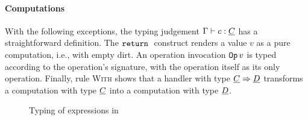 \paragraph{Computations}
With the following exceptions, the typing judgement $\Gamma \vdash c : \underline{C}$ has a straightforward definition. The $\mathtt{return}\;$ construct renders a value $v$ as a pure computation, i.e., with empty dirt. An operation invocation $\mathtt{Op}\,v$ is typed according to the operation's signature, with the operation itself as its only operation. Finally, rule \textsc{With} shows that a handler with type $\underline{C} \Rightarrow \underline{D}$ transforms a computation with type $\underline{C}$ into a computation with type $\underline{D}$. \cite{inferring}

\begin{figure}[H]
\begin{center}
\end{center}
\caption{Typing of expressions in \eff}\label{fig:eff-typing:e}
\end{figure}

